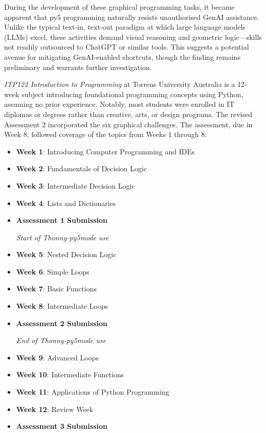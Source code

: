 During the development of these graphical programming tasks, it became apparent that py5 programming naturally resists unauthorised GenAI assistance. Unlike the typical text-in, text-out paradigm at which large language models (LLMs) excel, these activities demand visual reasoning and geometric logic---skills not readily outsourced to ChatGPT or similar tools. This suggests a potential avenue for mitigating GenAI-enabled shortcuts, though the finding remains preliminary and warrants further investigation.

\textit{ITP122 Introduction to Programming} at Torrens University Australia is a 12-week subject introducing foundational programming concepts using Python, assuming no prior experience. Notably, most students were enrolled in IT diplomas or degrees rather than creative, arts, or design programs. The revised Assessment 2 incorporated the six graphical challenges. The assessment, due in Week 8, followed coverage of the topics from Weeks 1 through 8:

\begin{itemize}[itemsep=0pt, topsep=6pt] %
\item \textbf{Week 1}: Introducing Computer Programming and IDEs
\item \textbf{Week 2}: Fundamentals of Decision Logic
\item \textbf{Week 3}: Intermediate Decision Logic
\item \textbf{Week 4}: Lists and Dictionaries
\item \textbf{Assessment 1 Submission}

\textit{Start of Thonny-py5mode use}~\hrulefill

\item \textbf{Week 5}: Nested Decision Logic
\item \textbf{Week 6}: Simple Loops
\item \textbf{Week 7}: Basic Functions
\item \textbf{Week 8}: Intermediate Loops
\item \textbf{Assessment 2 Submission}

\textit{End of Thonny-py5mode use}~\hrulefill

\item \textbf{Week 9}: Advanced Loops
\item \textbf{Week 10}: Intermediate Functions
\item \textbf{Week 11}: Applications of Python Programming
\item \textbf{Week 12}: Review Week
\item \textbf{Assessment 3 Submission}
\end{itemize}

